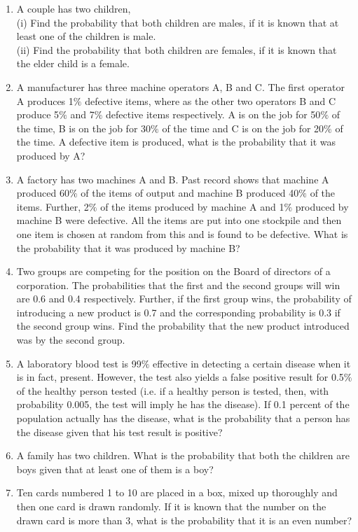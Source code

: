 \begin{enumerate}[label=\thesection.\arabic*.,ref=\thesection.\theenumi]
\item A couple has two children,\\
(i) Find the probability that both children are males, if it is known that at least one of the children is male.\\
(ii) Find the probability that both children are females, if it is known that the elder child is a female.\\
\item A manufacturer has three machine operators A, B and C. The first operator A
produces 1$\%$ defective items, where as the other two operators B and C produce 5$\%$ and 7$\%$ defective items respectively. A is on the job for 50$\%$ of the time, B is on the job for 30$\%$ of the time and C is on the job for 20$\%$ of the time. A defective item is produced, what is the probability that it was produced by A?\\

\item A factory has two machines A and B. Past record shows that machine A produced 60$\%$ of the items of output and machine B produced 40$\%$ of the items. Further, 2$\%$ of the items produced by machine A and 1$\%$ produced by machine B were defective. All the items are put into one stockpile and then one item is chosen at random from this and is found to be defective. What is the probability that it was produced by machine B?\\
%

\item Two groups are competing for the position on the Board of directors of a corporation. The probabilities that the first and the second groups will win are 0.6 and 0.4 respectively. Further, if the first group wins, the probability of introducing a new product is 0.7 and the corresponding probability is 0.3 if the second group wins. Find the probability that the new product introduced was by the second group.\\
\item A laboratory blood test is 99$\%$ effective in detecting a certain disease when it is in fact, present. However, the test also yields a false positive result for 0.5$\%$ of the healthy person tested (i.e. if a healthy person is tested, then, with probability 0.005, the test will imply he has the disease). If 0.1 percent of the population actually has the disease, what is the probability that a person has the disease given that his test result is positive?\\
\item A family has two children. What is the probability that both the children are boys given that at least one of them is a boy?\\
\item Ten cards numbered 1 to 10 are placed in a box, mixed up thoroughly and then one card is drawn randomly. If it is known that the number on the drawn card is more than 3, what is the probability that it is an even number?\\


\end{enumerate}
